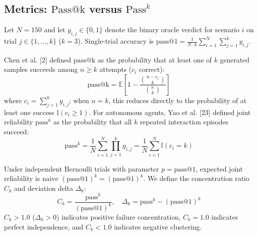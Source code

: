\documentclass[11pt,letterpaper]{article}
\begin{document}
\subsection{Metrics: $\text{Pass@k}$ versus $\text{Pass}^{k}$}
Let $N = 150$ and let $y_{i,j} \in \{0, 1\}$ denote the binary oracle verdict for scenario $i$ on trial $j \in \{1, \dots, k\}$ ($k=3$). Single-trial accuracy is $\text{pass@1} = \frac{1}{N \cdot k} \sum_{i=1}^N \sum_{j=1}^k y_{i,j}$.

Chen et al. [2] defined $\text{pass@k}$ as the probability that at least one of $k$ generated samples succeeds among $n \ge k$ attempts ($c_i$ correct):
$$\text{pass@k} = \mathbb{E}\left[ 1 - \frac{\binom{n - c_i}{k}}{\binom{n}{k}} \right]$$
where $c_i = \sum_{j=1}^k y_{i,j}$; when $n = k$, this reduces directly to the probability of at least one success $\mathbb{I}(c_i \ge 1)$. For autonomous agents, Yao et al. [23] defined joint reliability $\text{pass}^k$ as the probability that all $k$ repeated interaction episodes succeed:
$$\text{pass}^k = \frac{1}{N} \sum_{i=1}^N \prod_{j=1}^k y_{i,j} = \frac{1}{N} \sum_{i=1}^N \mathbb{I}(c_i = k)$$

Under independent Bernoulli trials with parameter $p = \text{pass@1}$, expected joint reliability is $\text{naive } (\text{pass@1})^k = (\text{pass@1})^k$. We define the concentration ratio $C_k$ and deviation delta $\Delta_k$:
$$C_k = \frac{\text{pass}^k}{(\text{pass@1})^k}, \quad \Delta_k = \text{pass}^k - (\text{pass@1})^k$$
$C_k > 1.0$ ($\Delta_k > 0$) indicates positive failure concentration, $C_k = 1.0$ indicates perfect independence, and $C_k < 1.0$ indicates negative clustering.
\end{document}
